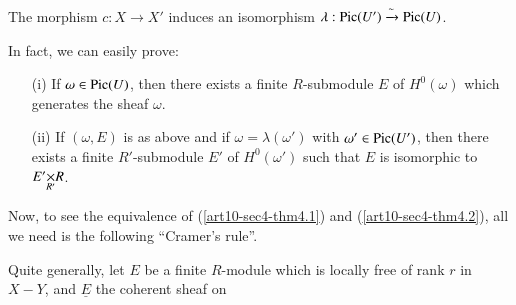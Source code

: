 \begin{theorem}\label{art10-sec4-thm4.2}
The morphism $c:X\to X'$ induces an isomorphism $\lambda:\operatorname{\mathrm{Pic}}(U')\xrightarrow{\sim}\operatorname{\mathrm{Pic}}(U)$.
\end{theorem}

In fact, we can easily prove:
\begin{itemize}
\item[(i)] If $\omega\in \operatorname{\mathrm{Pic}}(U)$, then there exists a finite $R$-submodule $E$ of $H^{0}(\omega)$ which generates the sheaf $\omega$.

\item[(ii)] If $(\omega,E)$ is as above and if $\omega=\lambda(\omega')$ with $\omega'\in \operatorname{\mathrm{Pic}}(U')$, then there exists a finite $R'$-submodule $E'$ of $H^{0}(\omega')$ such that $E$ is isomorphic to $\fprod{E'}{R}{R'}$.
\end{itemize}
Now, to see the equivalence of (\ref{art10-sec4-thm4.1}) and (\ref{art10-sec4-thm4.2}), all we need is the following ``Cramer's rule''.

\begin{remark}
Quite generally, let $E$ be a finite $R$-module which is locally free of rank $r$ in $X-Y$, and $\underline{E}$ the coherent sheaf on\pageoriginale %
\end{remark}
